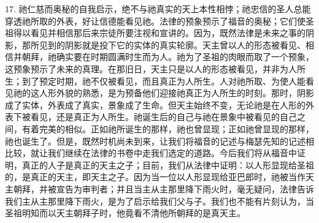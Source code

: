 17. 祂仁慈而奥秘的自我启示，绝不与祂真实的天上本性相悖；\newline{}祂忠信的圣人总能穿透祂所取的外表，好让信德能看见祂。\newline{}法律的预象预示了福音的奥秘；\newline{}它们使圣祖得以看见并相信那后来宗徒所要注视和宣讲的。\newline{}因为，既然法律是未来之事的阴影，那所见到的阴影就是投下它的实体的真实轮廓。\newline{}天主曾以人的形态被看见、相信并朝拜，祂确实要在时期圆满时生而为人。\newline{}祂为了圣祖的肉眼而取了一个预象，这预象预示了未来的真理。\newline{}在那旧日，天主只是以人的形态被看见，并非为人所生；\newline{}到了预定时期，祂不仅被看见，而且真正为人所生。\newline{}人对祂所取、为使人能看见祂的这人形外貌的熟悉，是为预备他们迎接祂真正为人所生的时刻。\newline{}那时，阴影成了实体，外表成了真实，景象成了生命。\newline{}但天主始终不变，无论祂是在人形的外表下被看见，还是真正为人所生。\newline{}祂诞生后的自己与祂在景象中被看见的自己之间，有着完美的相似。\newline{}正如祂所诞生的那样，祂也曾显现；正如祂曾显现的那样，祂也诞生了。\newline{}但是，既然时机尚未到来，让我们将福音的记述与梅瑟先知的记述相比较，\newline{}就让我们继续在法律的书卷中走我们选定的道路。\newline{}今后我们将从福音中证明，真正的人子是真正的天主之子；\newline{}目前，我们从法律中证明：以人形显现给圣祖的，是真正的天主，即天主之子。\newline{}因为当一位以人形显现给亚巴郎时，祂被当作天主朝拜，并被宣告为审判者；\newline{}并且当主从主那里降下雨火时，毫无疑问，法律告诉我们主从主那里降下雨火，\newline{}是为了启示给我们父与子。\newline{}我们也不能有片刻认为，当圣祖明知而以天主朝拜子时，他竟看不清他所朝拜的是真天主。\par


